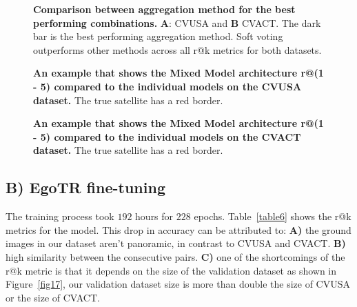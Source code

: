 \documentclass[10pt,letterpaper]{article}
\begin{document}
\begin{figure}[!h]
  \caption{{\bf Comparison between aggregation method for the best performing combinations. } {\bf A}: CVUSA and {\bf B} CVACT.  The dark bar is the best performing aggregation method. Soft voting outperforms other methods across all r@k metrics for both datasets.}
  
  \label{fig14}
\end{figure}

\begin{figure}[!h]
  \caption{{\bf An example that shows the Mixed Model architecture r@(1 - 5) compared to the individual models on the CVUSA dataset.} The true satellite has a red border.}
  \label{fig15}
\end{figure}

\begin{figure}[!h]
  \caption{{\bf An example that shows the Mixed Model architecture r@(1 - 5) compared to the individual models on the CVACT dataset.}  The true satellite has a red border.}
  \label{fig16}
\end{figure}

\subsection*{B) EgoTR fine-tuning}

The training process took $192$ hours for $228$ epochs. Table~\ref{table6} shows the r@k metrics for the model. This drop in accuracy can be attributed to: {\bf A)} the ground images in our dataset aren't panoramic, in contrast to CVUSA and CVACT. {\bf B)} high similarity between the consecutive pairs. {\bf C)} one of the shortcomings of the r@k metric is that it depends on the size of the validation dataset as shown in  Figure~\ref{fig17}, our validation dataset size is more than double the size of CVUSA or the size of CVACT.

\begin{table}[!ht]
  \centering
  \caption{
  {\bf r@k metrics of EgoTR fine-tuned over the reshaped BDD-trajectories dataset.}}
  \label{table6}
\end{table}
\end{document}
